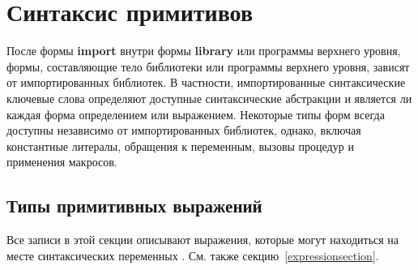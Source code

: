 \chapter{Синтаксис примитивов}\vspace{2mm}

После формы {\bfseries\cf import} внутри формы {\bfseries\cf library} или программы верхнего уровня,
формы, составляющие тело библиотеки или программы верхнего уровня, зависят от
импортированных библиотек.
В частности, импортированные синтаксические ключевые слова определяют
доступные синтаксические абстракции и является ли каждая форма определением или
выражением. Некоторые типы форм всегда доступны независимо от импортированных библиотек,
однако, включая константные литералы, обращения к переменным, вызовы
процедур и применения макросов.

\section{Типы примитивных выражений}
\label{primitiveexpressionsection}

Все записи в этой секции описывают выражения, которые могут находиться на месте синтаксических
переменных . См. также секцию~\ref{expressionsection}.

